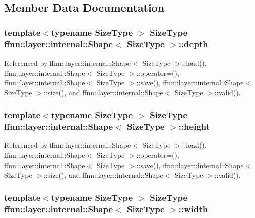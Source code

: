 \subsection{Member Data Documentation}
\hypertarget{structffnn_1_1layer_1_1internal_1_1_shapeensions_a34216373e9d09bb79b05a90ef9cec53b}{
\subsubsection[{depth}]{\setlength{\rightskip}{0pt plus 5cm}template$<$typename Size\-Type $>$ Size\-Type {\bf ffnn\-::layer\-::internal\-::\-Shape}$<$ Size\-Type $>$\-::depth}}\label{structffnn_1_1layer_1_1internal_1_1_shapeensions_a34216373e9d09bb79b05a90ef9cec53b}


Referenced by ffnn\-::layer\-::internal\-::\-Shape$<$ Size\-Type $>$\-::load(), ffnn\-::layer\-::internal\-::\-Shape$<$ Size\-Type $>$\-::operator=(), ffnn\-::layer\-::internal\-::\-Shape$<$ Size\-Type $>$\-::save(), ffnn\-::layer\-::internal\-::\-Shape$<$ Size\-Type $>$\-::size(), and ffnn\-::layer\-::internal\-::\-Shape$<$ Size\-Type $>$\-::valid().

\hypertarget{structffnn_1_1layer_1_1internal_1_1_shapeensions_a49348c4b65a649c9d55284e283bfa39e}{
\subsubsection[{height}]{\setlength{\rightskip}{0pt plus 5cm}template$<$typename Size\-Type $>$ Size\-Type {\bf ffnn\-::layer\-::internal\-::\-Shape}$<$ Size\-Type $>$\-::height}}\label{structffnn_1_1layer_1_1internal_1_1_shapeensions_a49348c4b65a649c9d55284e283bfa39e}


Referenced by ffnn\-::layer\-::internal\-::\-Shape$<$ Size\-Type $>$\-::load(), ffnn\-::layer\-::internal\-::\-Shape$<$ Size\-Type $>$\-::operator=(), ffnn\-::layer\-::internal\-::\-Shape$<$ Size\-Type $>$\-::save(), ffnn\-::layer\-::internal\-::\-Shape$<$ Size\-Type $>$\-::size(), and ffnn\-::layer\-::internal\-::\-Shape$<$ Size\-Type $>$\-::valid().

\hypertarget{structffnn_1_1layer_1_1internal_1_1_shapeensions_a1fac884bf9c7468e9408143195afc989}{
\subsubsection[{width}]{\setlength{\rightskip}{0pt plus 5cm}template$<$typename Size\-Type $>$ Size\-Type {\bf ffnn\-::layer\-::internal\-::\-Shape}$<$ Size\-Type $>$\-::width}}\label{structffnn_1_1layer_1_1internal_1_1_shapeensions_a1fac884bf9c7468e9408143195afc989}


